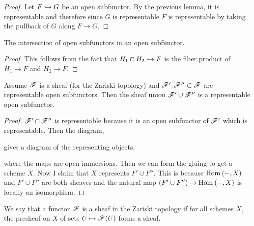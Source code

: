 \documentclass[12pt]{article}
\begin{document}
\begin{proof}
Let $F \hookrightarrow G$ be an open subfunctor. By the previous lemma, it is representable and therefore since $G$ is representable $F$ is representable by taking the pullback of $G$ along $F \to G$. 
\end{proof}

\begin{prop}
The intersection of open subfunctors in an open subfunctor. 
\end{prop}

\begin{proof}
This follows from the fact that $H_1 \cap H_2 \hookrightarrow F$ is the fiber product of $H_1 \to F$ and $H_2 \to F$.
\end{proof}

\begin{prop}
Assume $\mathscr{F}$ is a sheaf (for the Zariski topology) and $\mathscr{F}', \mathscr{F}'' \subset \mathscr{F}$ are representable open subfunctors. Then the sheaf union $\mathscr{F}' \cup \mathscr{F}''$ is a representable open subfunctor. 
\end{prop}

\begin{proof}
$\mathscr{F}' \cap \mathscr{F}''$ is representable because it is an open subfunctor of $\mathscr{F}'$ which is representable. Then the diagram,
\begin{center}
\end{center}
gives a diagram of the representing objects,
\begin{center}
\end{center}
where the maps are open immersions. Then we can form the gluing to get a scheme $X$. Now I claim that $X$ represents $F' \cup F''$. This is because $\mathrm{Hom}_{} \left( -, X \right)$ and $F' \cup F''$ are both sheaves and the natural map $(F' \cup F'') \to \mathrm{Hom}_{} \left( -, X \right)$ is locally an isomorphism. 
\end{proof}

\begin{defn}
We say that a functor $\mathscr{F}$ is a sheaf in the Zariski topology if for all schemes $X$, the presheaf on $X$ of sets $U \mapsto \mathscr{F}(U)$ forms a sheaf. 
\end{defn}
\end{document}
